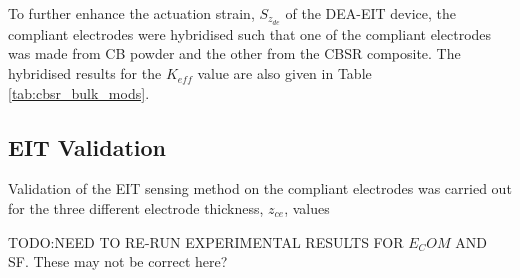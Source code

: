 To further enhance the actuation strain, $S_{z_{de}}$ of the DEA-EIT device, the compliant electrodes were hybridised such that one of the compliant electrodes was made from CB powder and the other from the CBSR composite. The hybridised results for the $K_{e\!f\!f}$ value are also given in Table \ref{tab:cbsr_bulk_mods}.



\subsection{EIT Validation}
\label{subsec:eit_validation}
Validation of the EIT sensing method on the compliant electrodes was carried out for the three different electrode thickness, $z_{ce}$, values

TODO:NEED TO RE-RUN EXPERIMENTAL RESULTS FOR $E_COM$ AND SF. These  may not be correct here?

